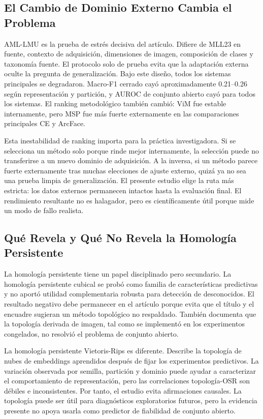 \documentclass[11pt]{article}
\begin{document}
\subsection{El Cambio de Dominio Externo Cambia el Problema}

AML-LMU es la prueba de estrés decisiva del artículo. Difiere de MLL23 en fuente, contexto de adquisición, dimensiones de imagen, composición de clases y taxonomía fuente. El protocolo solo de prueba evita que la adaptación externa oculte la pregunta de generalización. Bajo este diseño, todos los sistemas principales se degradaron. Macro-F1 cerrado cayó aproximadamente 0.21--0.26 según representación y partición, y AUROC de conjunto abierto cayó para todos los sistemas. El ranking metodológico también cambió: ViM fue estable internamente, pero MSP fue más fuerte externamente en las comparaciones principales CE y ArcFace.

Esta inestabilidad de ranking importa para la práctica investigadora. Si se selecciona un método solo porque rinde mejor internamente, la selección puede no transferirse a un nuevo dominio de adquisición. A la inversa, si un método parece fuerte externamente tras muchas elecciones de ajuste externo, quizá ya no sea una prueba limpia de generalización. El presente estudio elige la ruta más estricta: los datos externos permanecen intactos hasta la evaluación final. El rendimiento resultante no es halagador, pero es científicamente útil porque mide un modo de fallo realista.

\subsection{Qué Revela y Qué No Revela la Homología Persistente}

La homología persistente tiene un papel disciplinado pero secundario. La homología persistente cubical se probó como familia de características predictivas y no aportó utilidad complementaria robusta para detección de desconocidos. El resultado negativo debe permanecer en el artículo porque evita que el título y el encuadre sugieran un método topológico no respaldado. También documenta que la topología derivada de imagen, tal como se implementó en los experimentos congelados, no resolvió el problema de conjunto abierto.

La homología persistente Vietoris-Rips es diferente. Describe la topología de nubes de embeddings aprendidos después de fijar los experimentos predictivos. La variación observada por semilla, partición y dominio puede ayudar a caracterizar el comportamiento de representación, pero las correlaciones topología-OSR son débiles e inconsistentes. Por tanto, el estudio evita afirmaciones causales. La topología puede ser útil para diagnósticos exploratorios futuros, pero la evidencia presente no apoya usarla como predictor de fiabilidad de conjunto abierto.
\end{document}
